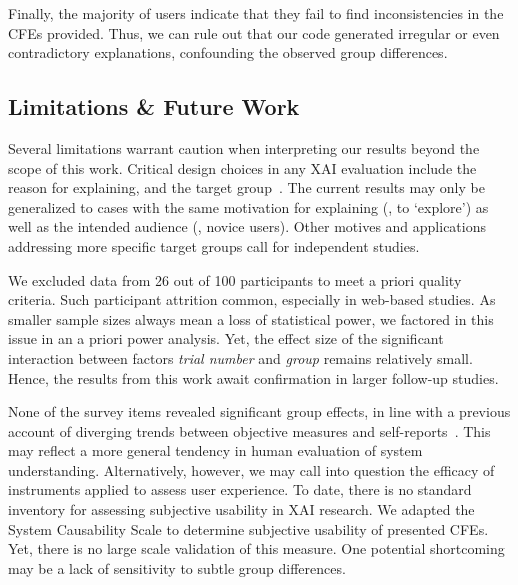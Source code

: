 Finally, the majority of users indicate that they fail to find inconsistencies in the \glspl{CFE} provided.
Thus, we can rule out that our code generated irregular or even contradictory explanations, confounding the observed group differences.

\subsection{Limitations \& Future Work}\label{subsec:limitations-future-work}

Several limitations warrant caution when interpreting our results beyond the scope of this work.
Critical design choices in any \gls{XAI} evaluation include the reason for explaining, and the target group~\cite{adadi_peeking_2018}.
The current results may only be generalized to cases with the same motivation for explaining (\ie, to `explore') as well as the intended audience (\ie, novice users).
Other motives and applications addressing more specific target groups call for independent studies.

We excluded data from 26 out of 100 participants to meet a priori quality criteria.
Such participant attrition common, especially in web-based studies. 
As smaller sample sizes always mean a loss of statistical power, we factored in this issue in an a priori power analysis. 
Yet, the effect size of the significant interaction between factors \textit{trial number} and \textit{group} remains relatively small. 
Hence, the results from this work await confirmation in larger follow-up studies.
 
None of the survey items revealed significant group effects, in line with a previous account of diverging trends between objective measures and self-reports~\citep{van_der_waa_evaluating_2021}. 
This may reflect a more general tendency in human evaluation of system understanding.
Alternatively, however, we may call into question the efficacy of instruments applied to assess user experience. 
To date, there is no standard inventory for assessing subjective usability in \gls{XAI} research.
We adapted the System Causability Scale \cite{holzinger_measuring_2020} to determine subjective usability of presented \glspl{CFE}.
Yet, there is no large scale validation of this measure.
One potential shortcoming may be a lack of sensitivity to subtle group differences.

